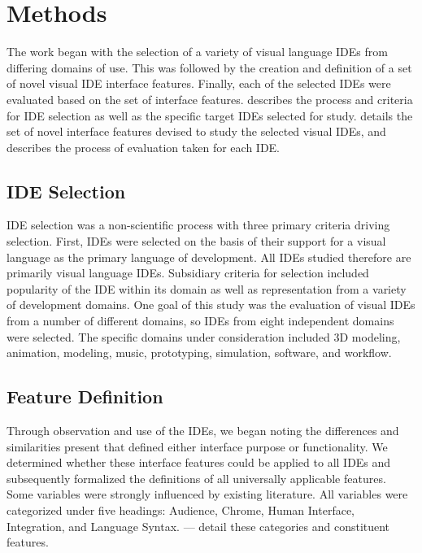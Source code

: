 \section{Methods} \label{sec:methods}

The work began with the selection of a variety of visual language IDEs from
differing domains of use. This was followed by the creation and definition
of a set of novel visual IDE interface features. Finally, each of the
selected IDEs were evaluated based on the set of interface features.
 describes the process and criteria for IDE
selection as well as the specific target IDEs selected for study.
 details the set of novel interface features
devised to study the selected visual IDEs, and 
describes the process of evaluation taken for each IDE.


\subsection{IDE Selection} \label{subsec:ideselection}

IDE selection was a non-scientific process with three primary criteria
driving selection. First, IDEs were selected on the basis of their support
for a visual language as the primary language of development. All IDEs
studied therefore are primarily visual language IDEs. Subsidiary criteria
for selection included popularity of the IDE within its domain as well as
representation from a variety of development domains. One goal of this
study was the evaluation of visual IDEs from a number of different domains,
so IDEs from eight independent domains were selected. The specific domains
under consideration included 3D modeling, animation, modeling, music,
prototyping, simulation, software, and workflow.


\subsection{Feature Definition} \label{subsec:featuredefinition}

Through observation and use of the IDEs, we began noting the differences
and similarities present that defined either interface purpose or
functionality. We determined whether these interface features could be
applied to all IDEs and subsequently formalized the definitions of all
universally applicable features. Some variables were strongly influenced by
existing literature. All variables were categorized under five headings:
Audience, Chrome, Human Interface, Integration, and Language Syntax.
 ---  detail these
categories and constituent features.


